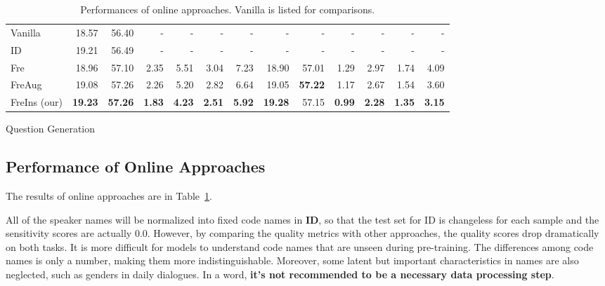 \begin{table}[th!]
\begin{subtable}{\linewidth}
\begin{tabular}{p{1.2cm}|rrrrrr|rrrrrr}
			\hline
			Vanilla & 18.57 & 56.40 & - &-&-&-&-&-&-&-&-&-\\
			ID & {19.21} & 56.49 & - &-&-&-&-&-&-&-&-&-\\
			Fre & {18.96} & {57.10} & 2.35 & 5.51 & 3.04 & 7.23 &
			{18.90} & 57.01 & 1.29 & 2.97 & 1.74 & 4.09 \\
			FreAug & 19.08 & 57.26 & 2.26 & 5.20 & 2.82 & 6.64 &
			19.05 & \textbf{57.22} & 1.17 & 2.67 & 1.54 & 3.60 \\
			FreIns (our) & \textbf{19.23} & \textbf{57.26} & \textbf{1.83} & \textbf{4.23} & \textbf{2.51}& \textbf{5.92} &
			\textbf{19.28} & 57.15 & \textbf{0.99} & \textbf{2.28} & \textbf{1.35} & \textbf{3.15} \\
			\bottomrule[1pt]
		\end{tabular}
		\caption{Question Generation}
		\label{tab:ddresults-qg}
	\end{subtable}
	\caption{Performances of online approaches. Vanilla is listed for comparisons. }	
	\label{tab:ddresults}
\end{table}






\subsection{Performance of Online Approaches}

The results of online approaches are in Table~\ref{tab:ddresults}.

All of the speaker names will be normalized into fixed code names in \textbf{ID}, so that the test set for ID is changeless for each sample and the sensitivity scores are actually 0.0. However, by comparing the quality metrics with other approaches, the quality scores drop dramatically on both tasks. It is more difficult for models to understand code names that are unseen during pre-training. The differences among code names is only a number, making them more indistinguishable. Moreover, some latent but important characteristics in names are also neglected, such as genders in daily dialogues. In a word, \textbf{it's not recommended to be a necessary data processing step}. 

